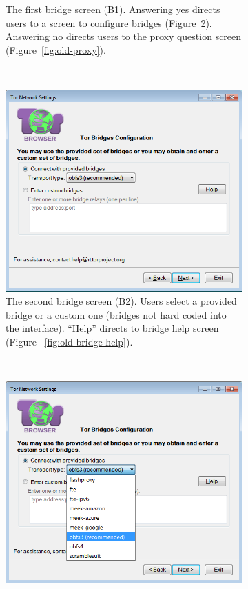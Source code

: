 \documentclass[USenglish,oneside,twocolumn]{article}
\begin{document}
\begin{figure}
\begin{subfigure}[b]{0.30\textwidth}
	\centering\captionsetup{width=1.5\linewidth}%
	\caption{The first bridge screen (B1). Answering yes directs users to a screen to configure bridges (Figure~\ref{fig:old-bridge-settings}). Answering no directs users to the proxy question screen (Figure~\ref{fig:old-proxy}).}
	\label{fig:old-bridge}
\end{subfigure}
~~~~~~~~~~
\begin{subfigure}[b]{0.30\textwidth}
	\includegraphics[width=\textwidth]{screenshots/OLD-bridgeSettings.png}
	\centering\captionsetup{width=1.5\linewidth}%
	\caption{The second bridge screen (B2). Users select a provided bridge or a custom one (bridges not hard coded into the interface). ``Help'' directs to bridge help screen (Figure ~\ref{fig:old-bridge-help}). }
	\label{fig:old-bridge-settings}
\end{subfigure}
~~~~~~~~~~~~~~~~~~~~~~~~~
\begin{subfigure}[b]{0.30\textwidth}
	\includegraphics[width=\textwidth]{screenshots/OLD-bridgeSettings-combobox.png}

\end{subfigure}
\end{figure}
\end{document}
